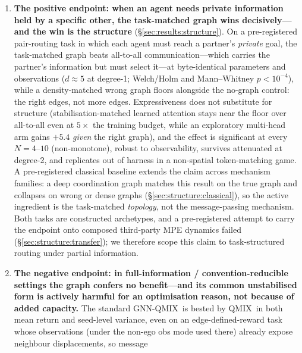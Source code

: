 \documentclass[10pt]{article}
\newcommand{\algoname}[1]{\textsc{#1}}
\newcommand{\qmix}{\algoname{QMIX}}
\newcommand{\gnnqmix}{\algoname{GNN-QMIX}}
\begin{document}
\begin{enumerate}[leftmargin=*,itemsep=0pt,topsep=2pt]
  \item \textbf{The positive endpoint: when an agent needs private
        information held by a specific other, the task-matched graph wins
        decisively---and the win is the structure}
        (\S\ref{sec:results:structure}). On a pre-registered pair-routing
        task in which each agent must reach a partner's \emph{private} goal,
        the task-matched graph beats all-to-all communication---which
        carries the partner's information but must select it---at
        byte-identical parameters and observations ($d\approx5$ at degree-1;
        Welch/Holm and Mann--Whitney $p<10^{-4}$), while a density-matched
        wrong graph floors alongside the no-graph control: the right edges,
        not more edges. Expressiveness does not substitute for structure
        (stabilisation-matched learned attention stays near the floor over
        all-to-all even at $5\times$ the training budget, while an exploratory
        multi-head arm gains $+5.4$
        \emph{given} the right graph), and the effect is significant at
        every $N{=}4$--$10$ (non-monotone), robust to observability,
        survives attenuated at degree-2, and replicates out of harness in a
        non-spatial token-matching game. A pre-registered classical baseline
        extends the claim across mechanism families: a deep coordination
        graph \citep{boehmer_2020_dcg} matches this result on the true graph
        and collapses on wrong or dense graphs
        (\S\ref{sec:structure:classical}), so the active ingredient is the
        task-matched \emph{topology}, not the message-passing mechanism.
        Both tasks are constructed archetypes, and a pre-registered attempt
        to carry the endpoint onto composed third-party \textsc{MPE}
        dynamics failed (\S\ref{sec:structure:transfer}); we therefore scope
        this claim to task-structured routing under partial information.
  \item \textbf{The negative endpoint: in full-information /
        convention-reducible settings the graph confers no benefit---and its
        common unstabilised form is actively harmful for an
        optimisation reason, not because of added capacity.} The standard
        \gnnqmix\ is bested by \qmix\ in
        both mean return and seed-level variance, even on an
        edge-defined-reward task whose observations (under the non-ego obs
        mode used there) already expose neighbour displacements, so message

\end{enumerate}
\end{document}
